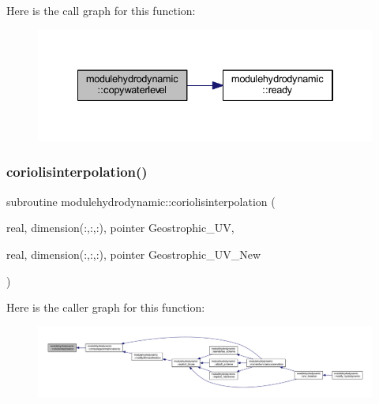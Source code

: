 Here is the call graph for this function\+:\nopagebreak
\begin{figure}[H]
\begin{center}
\leavevmode
\includegraphics[width=334pt]{namespacemodulehydrodynamic_a6a39453a1be66896cddce62126fa7bcc_cgraph}
\end{center}
\end{figure}
\mbox{\label{namespacemodulehydrodynamic_abfad909cb27f7db4f12b0cd022a34937}} 
\subsubsection{\texorpdfstring{coriolisinterpolation()}{coriolisinterpolation()}}
{\footnotesize\ttfamily subroutine modulehydrodynamic\+::coriolisinterpolation (\begin{DoxyParamCaption}\item[{real, dimension(\+:,\+:,\+:), pointer}]{Geostrophic\+\_\+\+UV,  }\item[{real, dimension(\+:,\+:,\+:), pointer}]{Geostrophic\+\_\+\+U\+V\+\_\+\+New }\end{DoxyParamCaption})\hspace{0.3cm}{\ttfamily [private]}}

Here is the caller graph for this function\+:\nopagebreak
\begin{figure}[H]
\begin{center}
\leavevmode
\includegraphics[width=350pt]{namespacemodulehydrodynamic_abfad909cb27f7db4f12b0cd022a34937_icgraph}
\end{center}
\end{figure}
\mbox{\label{namespacemodulehydrodynamic_a6effd02220d9411965b29d5f27b26d92}} 
